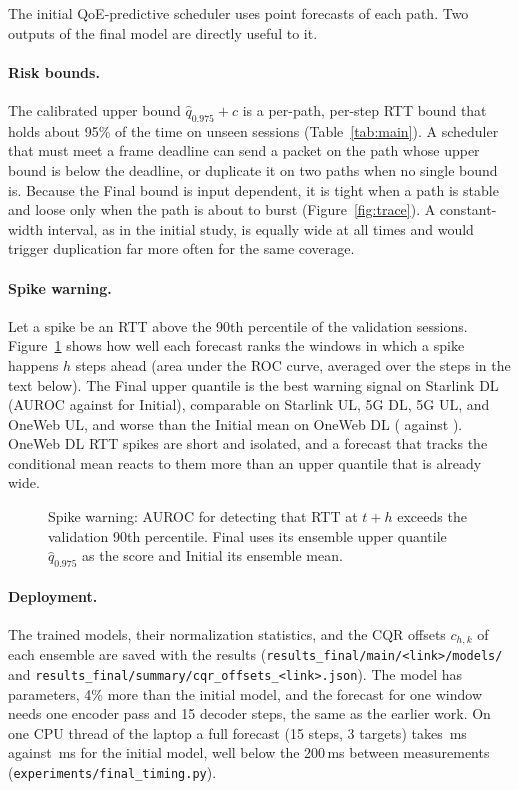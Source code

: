 The initial QoE-predictive scheduler uses point forecasts of each path. Two outputs of the final model are directly useful to it.

\paragraph{Risk bounds.} The calibrated upper bound $\hat{q}_{0.975}+c$ is a per-path, per-step RTT bound that holds about 95\% of the time on unseen sessions (Table~\ref{tab:main}). A scheduler that must meet a frame deadline can send a packet on the path whose upper bound is below the deadline, or duplicate it on two paths when no single bound is. Because the Final bound is input dependent, it is tight when a path is stable and loose only when the path is about to burst (Figure~\ref{fig:trace}). A constant-width interval, as in the initial study, is equally wide at all times and would trigger duplication far more often for the same coverage.

\paragraph{Spike warning.} Let a spike be an RTT above the 90th percentile of the validation sessions. Figure~\ref{fig:spike} shows how well each forecast ranks the windows in which a spike happens $h$ steps ahead (area under the ROC curve, averaged over the steps in the text below). The Final upper quantile is the best warning signal on Starlink DL (AUROC \AUCYthreeSLDL{} against \AUCYtwoSLDL{} for Initial), comparable on Starlink UL, 5G DL, 5G UL, and OneWeb UL, and worse than the Initial mean on OneWeb DL (\AUCYthreeOWDL{} against \AUCYtwoOWDL). OneWeb DL RTT spikes are short and isolated, and a forecast that tracks the conditional mean reacts to them more than an upper quantile that is already wide.

\begin{figure}[t]
  \centering
  \resizebox{\linewidth}{!}{}
  \caption{Spike warning: AUROC for detecting that RTT at $t+h$ exceeds the validation 90th percentile. Final uses its ensemble upper quantile $\hat{q}_{0.975}$ as the score and Initial its ensemble mean.}
  \label{fig:spike}
\end{figure}

\paragraph{Deployment.} The trained models, their normalization statistics, and the CQR offsets $c_{h,k}$ of each ensemble are saved with the results (\texttt{results\_\allowbreak{}final/\allowbreak{}main/\allowbreak{}<link>/\allowbreak{}models/\allowbreak{}} and \texttt{results\_\allowbreak{}final/\allowbreak{}summary/\allowbreak{}cqr\_\allowbreak{}offsets\_\allowbreak{}<link>.json}). The model has \ParamsDist{} parameters, 4\% more than the initial model, and the forecast for one window needs one encoder pass and 15 decoder steps, the same as the earlier work. On one CPU thread of the laptop a full forecast (15 steps, 3 targets) takes \TimeDSCPU\,ms against \TimeSSCPU\,ms for the initial model, well below the 200\,ms between measurements (\texttt{experiments/\allowbreak{}final\_\allowbreak{}timing.py}).
